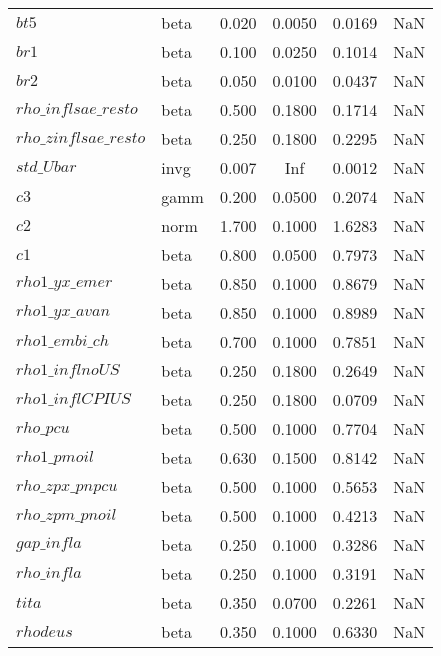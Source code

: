 \begin{center}
\begin{longtable}{llcccc}
$bt5$ & beta &   0.020 & 0.0050 &   0.0169 &     NaN \\ 
$br1$ & beta &   0.100 & 0.0250 &   0.1014 &     NaN \\ 
$br2$ & beta &   0.050 & 0.0100 &   0.0437 &     NaN \\ 
$rho\_inflsae\_resto$ & beta &   0.500 & 0.1800 &   0.1714 &     NaN \\ 
$rho\_zinflsae\_resto$ & beta &   0.250 & 0.1800 &   0.2295 &     NaN \\ 
$std\_Ubar$ & invg &   0.007 &    Inf &   0.0012 &     NaN \\ 
$c3$ & gamm &   0.200 & 0.0500 &   0.2074 &     NaN \\ 
$c2$ & norm &   1.700 & 0.1000 &   1.6283 &     NaN \\ 
$c1$ & beta &   0.800 & 0.0500 &   0.7973 &     NaN \\ 
$rho1\_yx\_emer$ & beta &   0.850 & 0.1000 &   0.8679 &     NaN \\ 
$rho1\_yx\_avan$ & beta &   0.850 & 0.1000 &   0.8989 &     NaN \\ 
$rho1\_embi\_ch$ & beta &   0.700 & 0.1000 &   0.7851 &     NaN \\ 
$rho1\_inflnoUS$ & beta &   0.250 & 0.1800 &   0.2649 &     NaN \\ 
$rho1\_inflCPIUS$ & beta &   0.250 & 0.1800 &   0.0709 &     NaN \\ 
$rho\_pcu$ & beta &   0.500 & 0.1000 &   0.7704 &     NaN \\ 
$rho1\_pmoil$ & beta &   0.630 & 0.1500 &   0.8142 &     NaN \\ 
$rho\_zpx\_pnpcu$ & beta &   0.500 & 0.1000 &   0.5653 &     NaN \\ 
$rho\_zpm\_pnoil$ & beta &   0.500 & 0.1000 &   0.4213 &     NaN \\ 
$gap\_infla$ & beta &   0.250 & 0.1000 &   0.3286 &     NaN \\ 
$rho\_infla$ & beta &   0.250 & 0.1000 &   0.3191 &     NaN \\ 
$tita$ & beta &   0.350 & 0.0700 &   0.2261 &     NaN \\ 
$rhodeus$ & beta &   0.350 & 0.1000 &   0.6330 &     NaN \\ 
\end{longtable}
 \end{center}
